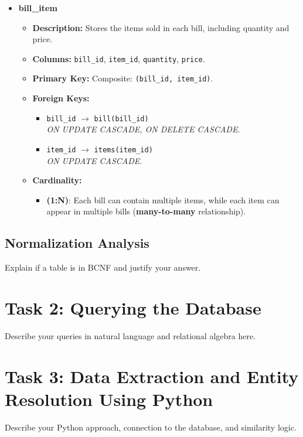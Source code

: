 \documentclass[12pt,a4paper]{article}
\begin{document}
\begin{itemize}
    \item \textbf{bill\_item}
    \begin{itemize}
        \item \textbf{Description:} Stores the items sold in each bill, including quantity and price.
        \item \textbf{Columns:} \texttt{bill\_id}, \texttt{item\_id}, \texttt{quantity}, \texttt{price}.
        \item \textbf{Primary Key:} Composite: \texttt{(bill\_id, item\_id)}.
        \item \textbf{Foreign Keys:} 
        \begin{itemize}
            \item \texttt{bill\_id} $\to$ \texttt{bill(bill\_id)} \\
            \hspace{1cm} \textit{ON UPDATE CASCADE, ON DELETE CASCADE}.
            \item \texttt{item\_id} $\to$ \texttt{items(item\_id)} \\
            \hspace{1cm} \textit{ON UPDATE CASCADE}.
        \end{itemize}
        \item \textbf{Cardinality:}
        \begin{itemize}
            \item \textbf{(1:N)}: Each bill can contain multiple items, while each item can appear in multiple bills (\textbf{many-to-many} relationship).
        \end{itemize}
    \end{itemize}


    
\end{itemize}






\subsection{Normalization Analysis}
Explain if a table is in BCNF and justify your answer.

\section{Task 2: Querying the Database}
Describe your queries in natural language and relational algebra here.

\section{Task 3: Data Extraction and Entity Resolution Using Python}
Describe your Python approach, connection to the database, and similarity logic.
\end{document}
